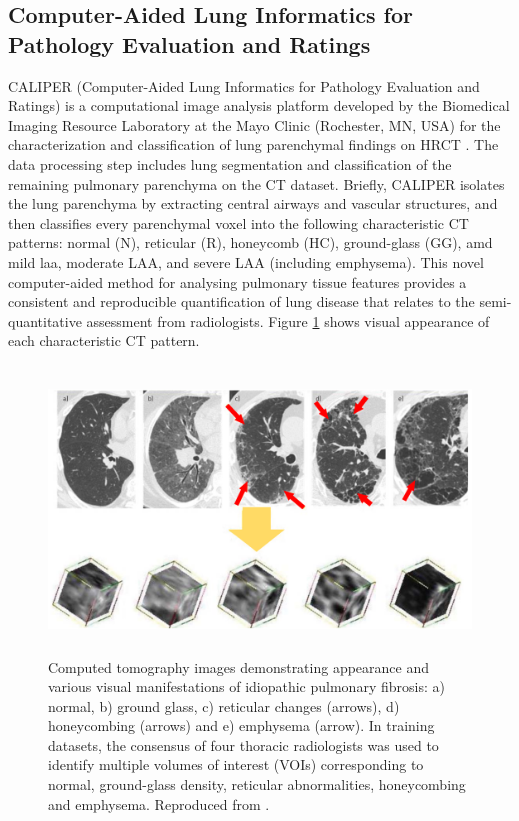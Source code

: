 \subsection{Computer-Aided Lung Informatics for Pathology Evaluation and Ratings} \label{CALIPERIntroduction}
CALIPER (Computer-Aided Lung Informatics for Pathology Evaluation and Ratings) is a computational image analysis platform developed by the Biomedical Imaging Resource Laboratory at the Mayo Clinic (Rochester, MN, USA) for the characterization and classification of lung parenchymal findings on HRCT \citep{maldonado2013automated,bartholmai2013quantitative,raghunath2014quantitative}. The data processing step includes lung segmentation and classification of the remaining pulmonary parenchyma on the CT dataset. Briefly, CALIPER isolates the lung parenchyma by extracting central airways and vascular structures, and then classifies every parenchymal voxel into the following characteristic CT patterns: normal (N), reticular (R), honeycomb (HC), ground-glass (GG), amd mild \gls{laa}, moderate LAA, and severe LAA (including emphysema). This novel computer-aided method for analysing pulmonary tissue features provides a consistent and reproducible quantification of lung disease that relates to the semi-quantitative assessment from radiologists\citep{maldonado2013automated}. Figure \ref{fig:CALIPERPatterns} shows visual appearance of each characteristic CT pattern.

\begin{figure}[htbp]
  \centering 
  \includegraphics[height=3.0in]{QuantitativeAnalysis/Image/CALIPERPatterns.png}
  \caption{Computed tomography images demonstrating appearance and various visual manifestations of idiopathic pulmonary fibrosis: a) normal, b) ground glass, c) reticular changes (arrows), d) honeycombing (arrows) and e) emphysema (arrow). In training datasets, the consensus of four thoracic radiologists was used to identify multiple volumes of interest (VOIs) corresponding to normal, ground-glass density, reticular abnormalities, honeycombing and emphysema. Reproduced from \citep{maldonado2013automated}.}
  \label{fig:CALIPERPatterns}
\end{figure}

